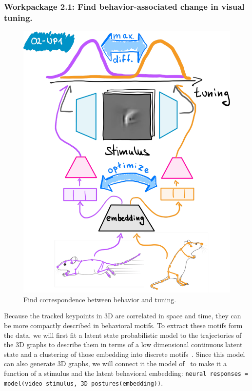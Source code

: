 \documentclass[B2,COG]{ercgrant}
\begin{document}
\subsubsection{Workpackage 2.1: Find behavior-associated change in visual tuning.\hfill {}}
%
\begin{figure}
\includegraphics[width=\linewidth]{figures/o2wp1.pdf}
\caption{Find correspondence between behavior and tuning.\label{fig:o2wp1}}
\end{figure}
%
Because the tracked keypoints in 3D are correlated in space and time, they can be more compactly described in behavioral motifs. 
To extract these motifs form the data, we will first fit a latent state probabilistic model to the trajectories of the 3D graphs to describe them in terms of a low dimensional continuous latent state and a clustering of those embedding into discrete motifs~\parencite[similar to][]{Wiltschko2015-ey, Wiltschko2020-zd}.
Since this model can also generate 3D graphs, we will connect it the model of~ to make it a function of a stimulus and the latent behavioral embedding: \texttt{neural responses = model(video stimulus, 3D postures(embedding))}.
\end{document}
